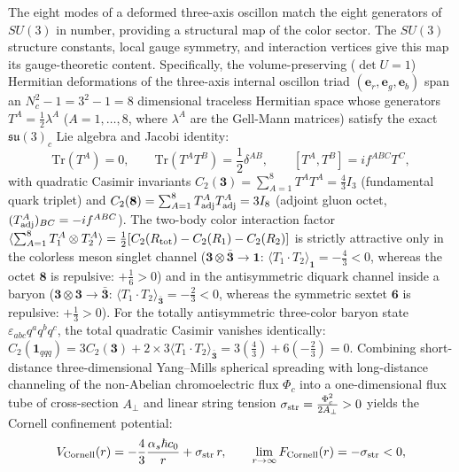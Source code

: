 \documentclass[11pt,a4paper]{article}
\begin{document}
The eight modes of a deformed three-axis oscillon match the eight generators of $SU(3)$ in number, providing a structural map of the color sector. The $SU(3)$ structure constants, local gauge symmetry, and interaction vertices give this map its gauge-theoretic content. Specifically, the volume-preserving ($\det U = 1$) Hermitian deformations of the three-axis internal oscillon triad $(\mathbf{e}_r, \mathbf{e}_g, \mathbf{e}_b)$ span an $N_c^2 - 1 = 3^2 - 1 = 8$ dimensional traceless Hermitian space whose generators $T^A = \frac{1}{2}\lambda^A$ ($A = 1,\dots,8$, where $\lambda^A$ are the Gell-Mann matrices) satisfy the exact $\mathfrak{su}(3)_c$ Lie algebra and Jacobi identity:
\begin{equation}
\mathrm{Tr}(T^A) = 0, \qquad \mathrm{Tr}(T^A T^B) = \frac{1}{2}\delta^{AB}, \qquad [T^A, T^B] = i f^{ABC} T^C,
\end{equation}
with quadratic Casimir invariants $C_2(\mathbf{3}) = \sum_{A=1}^8 T^A T^A = \frac{4}{3}I_3$ (fundamental quark triplet) and $C_2(\mathbf{8}) = \sum_{A=1}^8 T_{\rm adj}^A T_{\rm adj}^A = 3 I_8$ (adjoint gluon octet, $(T_{\rm adj}^A)_{BC} = -i f^{ABC}$). The two-body color interaction factor $\langle \sum_{A=1}^8 T_1^A \otimes T_2^A \rangle = \frac{1}{2}[C_2(R_{\rm tot}) - C_2(R_1) - C_2(R_2)]$ is strictly attractive only in the colorless meson singlet channel ($\mathbf{3}\otimes\bar{\mathbf{3}} \to \mathbf{1}$: $\langle T_1\cdot T_2\rangle_{\mathbf{1}} = -\frac{4}{3} < 0$, whereas the octet $\mathbf{8}$ is repulsive: $+\frac{1}{6} > 0$) and in the antisymmetric diquark channel inside a baryon ($\mathbf{3}\otimes\mathbf{3} \to \bar{\mathbf{3}}$: $\langle T_1\cdot T_2\rangle_{\bar{\mathbf{3}}} = -\frac{2}{3} < 0$, whereas the symmetric sextet $\mathbf{6}$ is repulsive: $+\frac{1}{3} > 0$). For the totally antisymmetric three-color baryon state $\varepsilon_{abc}q^a q^b q^c$, the total quadratic Casimir vanishes identically: $C_2(\mathbf{1}_{qqq}) = 3 C_2(\mathbf{3}) + 2\times 3\langle T_1\cdot T_2\rangle_{\bar{\mathbf{3}}} = 3\left(\frac{4}{3}\right) + 6\left(-\frac{2}{3}\right) = 0$. Combining short-distance three-dimensional Yang--Mills spherical spreading with long-distance channeling of the non-Abelian chromoelectric flux $\Phi_c$ into a one-dimensional flux tube of cross-section $A_\perp$ and linear string tension $\sigma_{\rm str} = \frac{\Phi_c^2}{2 A_\perp} > 0$ yields the Cornell confinement potential:
\begin{equation}
V_{\rm Cornell}(r) = -\frac{4}{3}\frac{\alpha_s \hbar c_0}{r} + \sigma_{\rm str}\,r, \qquad \lim_{r\to\infty} F_{\rm Cornell}(r) = -\sigma_{\rm str} < 0,
\end{equation}
\end{document}
